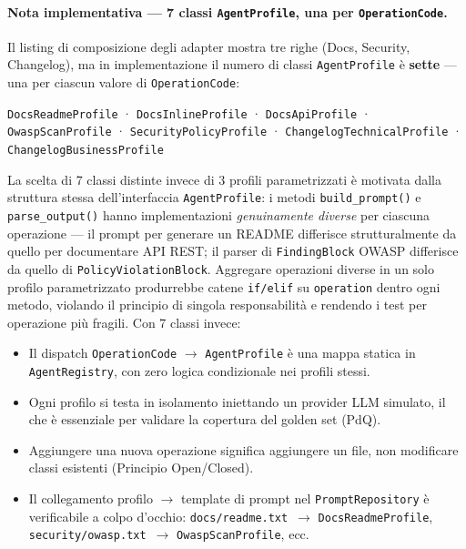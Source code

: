 \documentclass[11pt,a4paper]{article}
\begin{document}
\paragraph{Nota implementativa --- 7 classi \texttt{AgentProfile}, una per \texttt{OperationCode}.}
Il listing di composizione degli adapter mostra tre righe (Docs, Security, Changelog), ma in implementazione il numero di classi \texttt{AgentProfile} è \textbf{sette} --- una per ciascun valore di \texttt{OperationCode}:

\begin{center}
\small
\texttt{DocsReadmeProfile} · \texttt{DocsInlineProfile} · \texttt{DocsApiProfile} ·
\texttt{OwaspScanProfile} · \texttt{SecurityPolicyProfile} ·
\texttt{ChangelogTechnicalProfile} · \texttt{ChangelogBusinessProfile}
\end{center}

La scelta di 7 classi distinte invece di 3 profili parametrizzati è motivata dalla struttura stessa dell'interfaccia \texttt{AgentProfile}: i metodi \texttt{build\_prompt()} e \texttt{parse\_output()} hanno implementazioni \emph{genuinamente diverse} per ciascuna operazione --- il prompt per generare un README differisce strutturalmente da quello per documentare API REST; il parser di \texttt{FindingBlock} OWASP differisce da quello di \texttt{PolicyViolationBlock}. Aggregare operazioni diverse in un solo profilo parametrizzato produrrebbe catene \texttt{if/elif} su \texttt{operation} dentro ogni metodo, violando il principio di singola responsabilità e rendendo i test per operazione più fragili. Con 7 classi invece:

\begin{itemize}
  \item Il dispatch \texttt{OperationCode} $\to$ \texttt{AgentProfile} è una mappa statica in \texttt{AgentRegistry}, con zero logica condizionale nei profili stessi.
  \item Ogni profilo si testa in isolamento iniettando un provider LLM simulato, il che è essenziale per validare la copertura del golden set (PdQ).
  \item Aggiungere una nuova operazione significa aggiungere un file, non modificare classi esistenti (Principio Open/Closed).
  \item Il collegamento profilo $\to$ template di prompt nel \texttt{PromptRepository} è verificabile a colpo d'occhio: \texttt{docs/\allowbreak{}readme.txt}\ $\to$ \texttt{DocsReadmeProfile}, \texttt{security/\allowbreak{}owasp.txt}\ $\to$ \texttt{OwaspScanProfile}, ecc.
\end{itemize}
\end{document}
